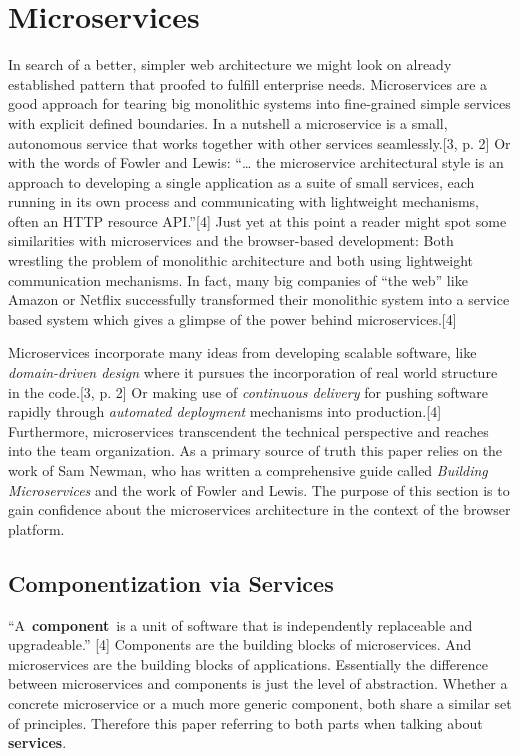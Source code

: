 \documentclass[]{article}
\begin{document}
\section{Microservices}\label{microservices}

In search of a better, simpler web architecture we might look on already
established pattern that proofed to fulfill enterprise needs.
Microservices are a good approach for tearing big monolithic systems
into fine-grained simple services with explicit defined boundaries. In a
nutshell a microservice is a small, autonomous service that works
together with other services seamlessly.{[}3, p. 2{]} Or with the words
of Fowler and Lewis: ``\ldots{} the microservice architectural style is
an approach to developing a single application as a suite of small
services, each running in its own process and communicating with
lightweight mechanisms, often an HTTP resource API.''{[}4{]} Just yet at
this point a reader might spot some similarities with microservices and
the browser-based development: Both wrestling the problem of monolithic
architecture and both using lightweight communication mechanisms. In
fact, many big companies of ``the web'' like Amazon or Netflix
successfully transformed their monolithic system into a service based
system which gives a glimpse of the power behind microservices.{[}4{]}

Microservices incorporate many ideas from developing scalable software,
like \emph{domain-driven design} where it pursues the incorporation of
real world structure in the code.{[}3, p. 2{]} Or making use of
\emph{continuous delivery} for pushing software rapidly through
\emph{automated deployment} mechanisms into production.{[}4{]}
Furthermore, microservices transcendent the technical perspective and
reaches into the team organization. As a primary source of truth this
paper relies on the work of Sam Newman, who has written a comprehensive
guide called \emph{Building Microservices} and the work of Fowler and
Lewis. The purpose of this section is to gain confidence about the
microservices architecture in the context of the browser platform.

\subsection{Componentization via
Services}\label{componentization-via-services}

``A~\textbf{component}~is a unit of software that is independently
replaceable and upgradeable.'' {[}4{]} Components are the building
blocks of microservices. And microservices are the building blocks of
applications. Essentially the difference between microservices and
components is just the level of abstraction. Whether a concrete
microservice or a much more generic component, both share a similar set
of principles. Therefore this paper referring to both parts when talking
about \textbf{services}.
\end{document}
